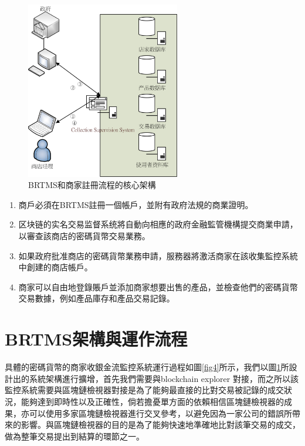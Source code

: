 	\begin{figure}[h]
		\centering
		\includegraphics[width = 0.6\textwidth]{fig3.png}
		\caption{BRTMS和商家註冊流程的核心架構}\label{fig3}
	\end{figure}

	\begin{enumerate}
		\item 商戶必須在BRTMS註冊一個帳戶，並附有政府法規的商業證明。
		\item 区块链的实名交易监督系统將自動向相應的政府金融監管機構提交商業申請，以審查該商店的密碼貨幣交易業務。
		\item 如果政府批准商店的密碼貨幣業務申請，服務器將激活商家在該收集監控系統中創建的商店帳戶。
		\item 商家可以自由地登錄賬戶並添加商家想要出售的產品，並檢查他們的密碼貨幣交易數據，例如產品庫存和產品交易記錄。
	\end{enumerate}

	\section{BRTMS架構與運作流程}
	具體的密碼貨幣的商家收銀金流監控系統運行過程如圖\ref{fig4}所示，我們以圖\ref{fig3}所設計出的系統架構進行擴增，首先我們需要與blockchain explorer 對接，而之所以該監控系統需要與區塊鏈檢視器對接是為了能夠最直接的比對交易被記錄的成交狀況，能夠達到即時性以及正確性，倘若擔憂單方面的依賴相信區塊鏈檢視器的成果，亦可以使用多家區塊鏈檢視器進行交叉參考，以避免因為一家公司的錯誤所帶來的影響。與區塊鏈檢視器的目的是為了能夠快速地準確地比對該筆交易的成交，做為整筆交易提出到結算的環節之一。
	
